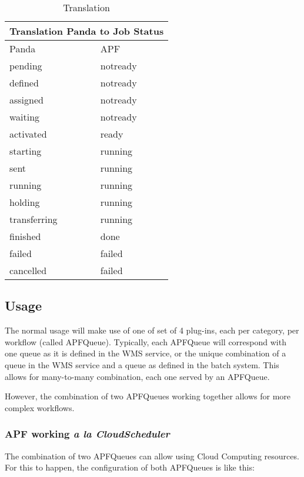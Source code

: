 \documentclass[a4paper]{jpconf}
\begin{document}
\begin{table}
\begin{tabular}{|l|l|}
\hline
\multicolumn{2}{|c|}{Translation Panda to Job Status} \\
\hline
\hline
Panda         & APF       \\ \hline 
\hline
\hline
pending       & notready  \\ \hline
defined       & notready  \\ \hline
assigned      & notready  \\ \hline
waiting       & notready  \\ \hline
activated     & ready     \\ \hline
starting      & running   \\ \hline
sent          & running   \\ \hline
running       & running   \\ \hline
holding       & running   \\ \hline
transferring  & running   \\ \hline
finished      & done      \\ \hline
failed        & failed    \\ \hline
cancelled     & failed    \\ \hline
\end{tabular}\caption{Translation}
\label{translation}
\end{table}


\subsection{Usage}

The normal usage will make use of one of set of 4 plug-ins, each per category, per workflow (called APFQueue). 
Typically, each APFQueue will correspond with one queue as it is defined in the WMS service, 
or the unique combination of a queue in the WMS service and a queue as defined in the batch system. 
This allows for many-to-many combination, each one served by an APFQueue. 

However, the combination of two APFQueues working together allows for more complex workflows.

\subsubsection{APF working \emph{a la CloudScheduler}}

The combination of two APFQueues can allow using Cloud Computing resources. 
For this to happen, the configuration of both APFQueues is like this:
\end{document}
